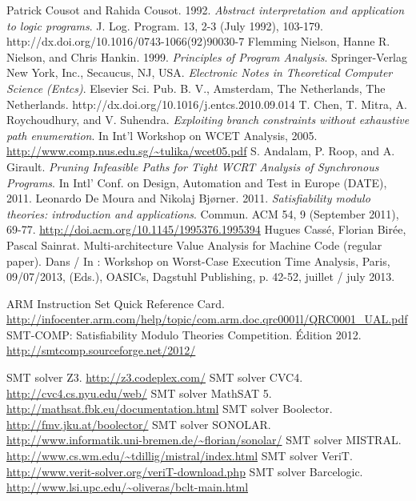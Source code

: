 \documentclass[french]{article}
\begin{document}
\newpage{}
%
\begin{thebibliography}{1}
    
    Patrick Cousot and Rahida Cousot. 1992. \textit{Abstract interpretation and application to logic programs}. J. Log. Program. 13, 2-3 (July 1992), 103-179. http://dx.doi.org/10.1016/0743-1066(92)90030-7
    Flemming Nielson, Hanne R. Nielson, and Chris Hankin. 1999. \textit{Principles of Program Analysis}. Springer-Verlag New York, Inc., Secaucus, NJ, USA.
    \textit{Electronic Notes in Theoretical Computer Science (Entcs)}. Elsevier Sci. Pub. B. V., Amsterdam, The Netherlands, The Netherlands. http://dx.doi.org/10.1016/j.entcs.2010.09.014
     T. Chen, T. Mitra, A. Roychoudhury, and V. Suhendra. \textit{Exploiting branch constraints without exhaustive path enumeration}. In Int’l Workshop on WCET Analysis, 2005.
    \url{http://www.comp.nus.edu.sg/~tulika/wcet05.pdf}
    S. Andalam, P. Roop, and A. Girault. \textit{Pruning Infeasible Paths for Tight WCRT Analysis of Synchronous Programs}. In Intl’ Conf. on Design, Automation and Test in Europe (DATE), 2011.
    Leonardo De Moura and Nikolaj Bjørner. 2011. \textit{Satisfiability modulo theories: introduction and applications}. Commun. ACM 54, 9 (September 2011), 69-77.
    \url{http://doi.acm.org/10.1145/1995376.1995394}
    Hugues Cassé, Florian Birée, Pascal Sainrat. Multi-architecture Value Analysis for Machine Code (regular paper). Dans / In : Workshop on Worst-Case Execution Time Analysis, Paris, 09/07/2013, (Eds.), OASICs, Dagstuhl Publishing, p. 42-52, juillet / july 2013.

     ARM Instruction Set Quick Reference Card. \url{http://infocenter.arm.com/help/topic/com.arm.doc.qrc0001l/QRC0001_UAL.pdf}
     SMT-COMP: Satisfiability Modulo Theories Competition. Édition 2012. \url{http://smtcomp.sourceforge.net/2012/}

     SMT solver Z3. \url{http://z3.codeplex.com/}
     SMT solver CVC4. \url{http://cvc4.cs.nyu.edu/web/}
     SMT solver MathSAT 5. \url{http://mathsat.fbk.eu/documentation.html}
     SMT solver Boolector. \url{http://fmv.jku.at/boolector/}
     SMT solver SONOLAR. \url{http://www.informatik.uni-bremen.de/~florian/sonolar/}
     SMT solver MISTRAL. \url{http://www.cs.wm.edu/~tdillig/mistral/index.html}
     SMT solver VeriT. \url{http://www.verit-solver.org/veriT-download.php}
     SMT solver Barcelogic. \url{http://www.lsi.upc.edu/~oliveras/bclt-main.html}
\end{thebibliography}
\end{document}
